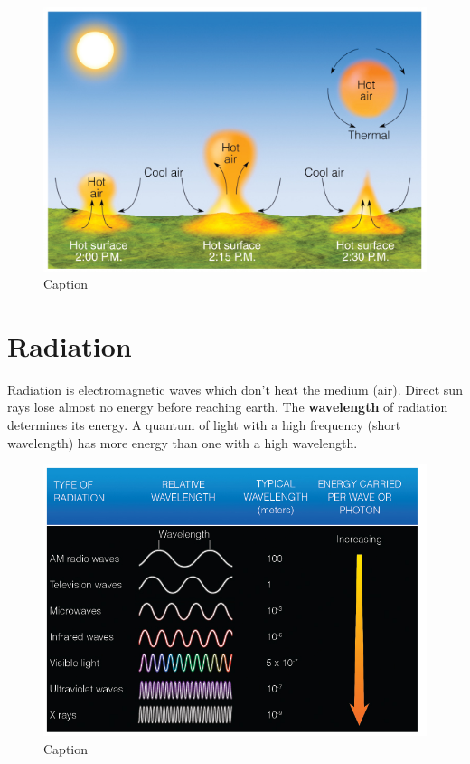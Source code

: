 \documentclass[12pt,oneside]{book}
\begin{document}
\begin{figure}

{\centering \includegraphics[width=0.7\linewidth]{figures/Figure119} 

}

\caption{Caption}\label{fig:Heattransfer3}
\end{figure}

\section{Radiation}\label{radiation}

Radiation is electromagnetic waves which don't heat the medium (air).
Direct sun rays lose almost no energy before reaching earth. The
\textbf{wavelength} of radiation determines its energy. A quantum of
light with a high frequency (short wavelength) has more energy than one
with a high wavelength.

\begin{figure}

{\centering \includegraphics[width=0.8\linewidth]{figures/Figure120} 

}

\caption{Caption}\label{fig:Radiation}
\end{figure}
\end{document}

